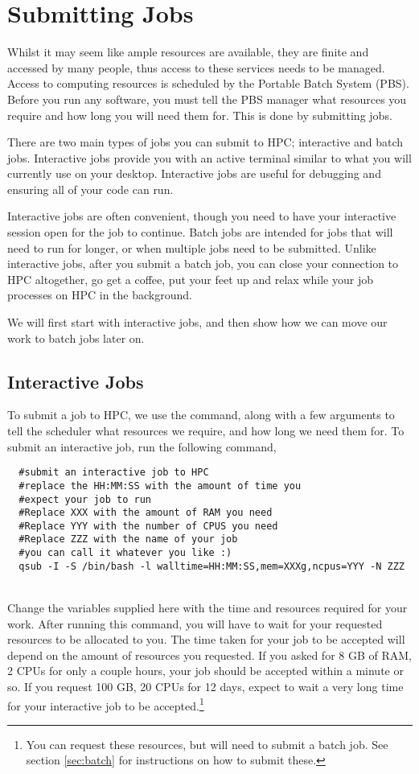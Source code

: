 \section{Submitting Jobs}
\label{ref:submitting}
%
%
%
Whilst it may seem like ample resources are available, they are finite and accessed by many people, thus access to these services needs to be managed. Access to computing resources is scheduled by the Portable Batch System (PBS). Before you run any software, you must tell the PBS manager what resources you require and how long you will need them for. This is done by submitting jobs.
%
%
\par
%
%
There are two main types of jobs you can submit to HPC; interactive and batch jobs. Interactive jobs provide you with an active terminal similar to what you will currently use on your desktop. Interactive jobs are useful for debugging and ensuring all of your code can run.
%
%
\par
%
%
Interactive jobs are often convenient, though you need to have your interactive session open for the job to continue. Batch jobs are intended for jobs that will need to run for longer, or when multiple jobs need to be submitted. Unlike interactive jobs, after you submit a batch job, you can close your connection to HPC altogether, go get a coffee, put your feet up and relax while your job processes on HPC in the background.
%
%
%
\par
We will first start with interactive jobs, and then show how we can move our work to batch jobs later on.
%
%
%
\subsection{Interactive Jobs}
To submit a job to HPC, we use the  command, along with a few arguments to tell the scheduler what resources we require, and how long we need them for. To submit an interactive job, run the following command,
%
%
\\
\par
\begin{verbatim}
  #submit an interactive job to HPC
  #replace the HH:MM:SS with the amount of time you
  #expect your job to run
  #Replace XXX with the amount of RAM you need
  #Replace YYY with the number of CPUS you need
  #Replace ZZZ with the name of your job
  #you can call it whatever you like :)
  qsub -I -S /bin/bash -l walltime=HH:MM:SS,mem=XXXg,ncpus=YYY -N ZZZ
\end{verbatim}
%
\\
%
Change the variables supplied here with the time and resources required for your work. After running this command, you will have to wait for your requested resources to be allocated to you. The time taken for your job to be accepted will depend on the amount of resources you requested. If you asked for 8 GB of RAM, 2 CPUs for only a couple hours, your job should be accepted within a minute or so. If you request 100 GB, 20 CPUs for 12 days, expect to wait a very long time for your interactive job to be accepted.\footnote{You can request these resources, but will need to submit a batch job. See section \ref{sec:batch} for instructions on how to submit these.}

